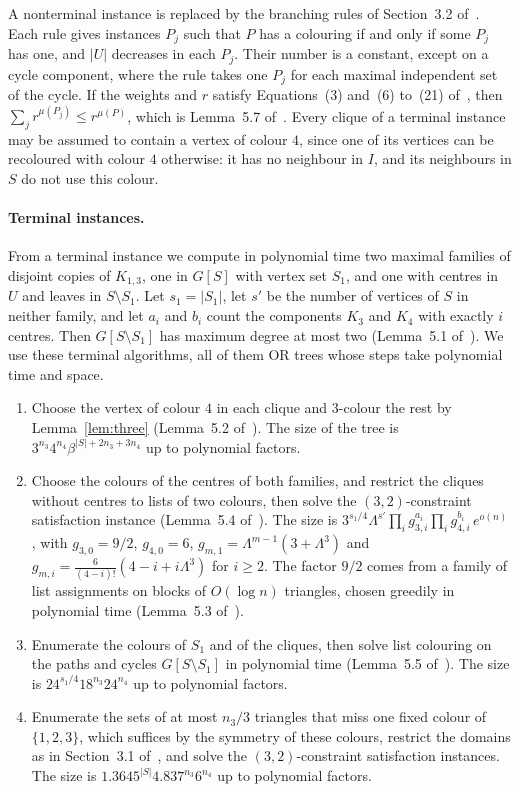 \documentclass[11pt]{article}
\theoremstyle{remark}
\begin{document}
A nonterminal instance is replaced by the branching rules of Section~3.2 of~\cite{WGJ24}. Each rule gives instances $P_j$ such that $P$ has a colouring if and only if some $P_j$ has one, and $|U|$ decreases in each $P_j$. Their number is a constant, except on a cycle component, where the rule takes one $P_j$ for each maximal independent set of the cycle. If the weights and $r$ satisfy Equations~(3) and~(6) to~(21) of~\cite{WGJ24}, then $\sum_j r^{\mu(P_j)} \le r^{\mu(P)}$, which is Lemma~5.7 of~\cite{YS26}. Every clique of a terminal instance may be assumed to contain a vertex of colour $4$, since one of its vertices can be recoloured with colour $4$ otherwise: it has no neighbour in $I$, and its neighbours in $S$ do not use this colour.

\paragraph{Terminal instances.} From a terminal instance we compute in polynomial time two maximal families of disjoint copies of $K_{1,3}$, one in $G[S]$ with vertex set $S_1$, and one with centres in $U$ and leaves in $S \setminus S_1$. Let $s_1 = |S_1|$, let $s'$ be the number of vertices of $S$ in neither family, and let $a_i$ and $b_i$ count the components $K_3$ and $K_4$ with exactly $i$ centres. Then $G[S \setminus S_1]$ has maximum degree at most two (Lemma~5.1 of~\cite{YS26}). We use these terminal algorithms, all of them OR trees whose steps take polynomial time and space.
\begin{enumerate}[(T1)]
\item Choose the vertex of colour $4$ in each clique and 3-colour the rest by Lemma~\ref{lem:three} (Lemma~5.2 of~\cite{YS26}). The size of the tree is $3^{n_3} 4^{n_4} \beta^{|S| + 2n_3 + 3n_4}$ up to polynomial factors.
\item Choose the colours of the centres of both families, and restrict the cliques without centres to lists of two colours, then solve the $(3,2)$-constraint satisfaction instance (Lemma~5.4 of~\cite{YS26}). The size is $3^{s_1/4} \Lambda^{s'} \prod_i g_{3,i}^{a_i} \prod_i g_{4,i}^{b_i}\, e^{o(n)}$, with $g_{3,0} = 9/2$, $g_{4,0} = 6$, $g_{m,1} = \Lambda^{m-1}(3 + \Lambda^3)$ and $g_{m,i} = \frac{6}{(4-i)!}(4 - i + i\Lambda^3)$ for $i \ge 2$. The factor $9/2$ comes from a family of list assignments on blocks of $O(\log n)$ triangles, chosen greedily in polynomial time (Lemma~5.3 of~\cite{YS26}).
\item Enumerate the colours of $S_1$ and of the cliques, then solve list colouring on the paths and cycles $G[S \setminus S_1]$ in polynomial time (Lemma~5.5 of~\cite{YS26}). The size is $24^{s_1/4} 18^{n_3} 24^{n_4}$ up to polynomial factors.
\item Enumerate the sets of at most $n_3/3$ triangles that miss one fixed colour of $\{1,2,3\}$, which suffices by the symmetry of these colours, restrict the domains as in Section~3.1 of~\cite{WGJ24}, and solve the $(3,2)$-constraint satisfaction instances. The size is $1.3645^{|S|} 4.837^{n_3} 6^{n_4}$ up to polynomial factors.
\end{enumerate}
\end{document}
